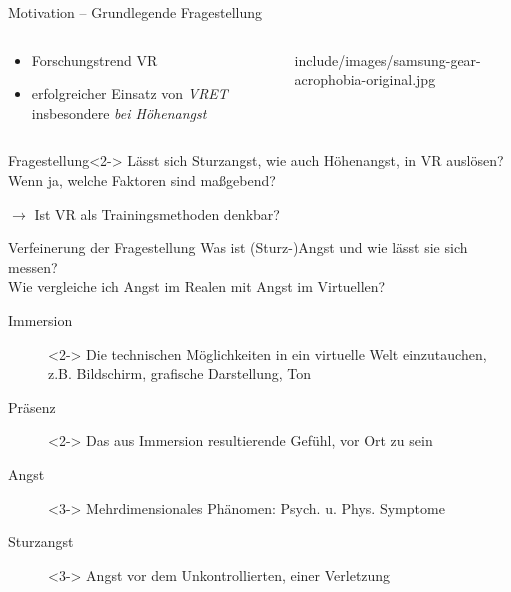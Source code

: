 \begin{frame}{Motivation -- Grundlegende Fragestellung}
\begin{columns}
	\begin{column}{0.48\textwidth}
		\begin{itemize}[label=\textcolor{tertiary}{}]
			\item Forschungstrend \gls{VR}
			\item erfolgreicher Einsatz von \textit{\gls{VRET}} insbesondere \textit{bei Höhenangst} \autocite{Emmelkamp2001}
		\end{itemize}
	\end{column}
	\begin{column}{0.44\textwidth}
		\vfill
		\hfill
		\begin{overpic}[width=0.9\columnwidth]{include/images/samsung-gear-acrophobia-original.jpg}
		\end{overpic}
	\end{column}
\end{columns}
\vfill
{}
\begin{block}{Fragestellung}<2->
	Lässt sich \textcolor{tertiary}{Sturzangst}, wie auch Höhenangst, \textcolor{tertiary}{in \gls{VR} auslösen?}\\Wenn ja, welche Faktoren sind maßgebend?
	
	\hfill $\rightarrow$ Ist \gls{VR} als Trainingsmethoden denkbar?
\end{block}
\end{frame}

\begin{frame}{Verfeinerung der Fragestellung}
Was ist (Sturz-)Angst und wie lässt sie sich messen?\\Wie vergleiche ich Angst im Realen mit Angst im Virtuellen?
\begin{description}
\item[Immersion]<2-> Die technischen Möglichkeiten in ein virtuelle Welt einzutauchen,\\z.B. Bildschirm, grafische Darstellung, Ton \autocite{McMahan2003}
\item[Präsenz]<2-> Das aus Immersion resultierende Gefühl, vor Ort zu sein \autocite{McMahan2003}
\item[Angst]<3-> Mehrdimensionales Phänomen: Psych. u. Phys. Symptome \autocite{Krohne1996}
\item[Sturzangst]<3-> Angst vor dem Unkontrollierten, einer Verletzung \autocite{Lewis2010}
\end{description}
\begin{center}
\end{center}
\end{frame}

